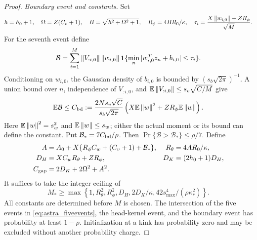\begin{proof}
\emph{Boundary event and constants.}
Set
\[
 h=h_0+1,\quad \Omega=Z(C_v+1),\quad
 B=\sqrt{h^2+\Omega^2+1},\quad R_\phi=4BR_0/\kappa,
 \quad \tau_i=\frac{X\left\lVert w_{i,0}\right\rVert+ZR_\phi}{\sqrt M}.
\]
For the seventh event define
\[
 \mathcal B=\sum_{i=1}^M\left\lVert V_{:i,0}\right\rVert\left\lVert w_{i,0}\right\rVert
 \mathbf1\{\min_n|w_{i,0}^Tz_n+b_{i,0}|\le\tau_i\}.
\]
Conditioning on $w_{i,0}$, the Gaussian density of $b_{i,0}$ is bounded
by $(s_b\sqrt{2\pi})^{-1}$. A union bound over $n$, independence
of $V_{:i,0}$, and $\mathbb{E}\left\lVert V_{:i,0}\right\rVert\le s_v\sqrt{C/M}$ give
\[
 \mathbb{E}\mathcal B\le C_{\rm bd}
 :=\frac{2Ns_v\sqrt C}{s_b\sqrt{2\pi}}
 \left(X\mathbb{E}\left\lVert w\right\rVert^2+ZR_\phi\mathbb{E}\left\lVert w\right\rVert\right).
\]
Here $\mathbb{E}\left\lVert w\right\rVert^2=s_w^2$ and $\mathbb{E}\left\lVert w\right\rVert\le s_w$; either the actual
moment or its bound can define the constant. Put
$\mathcal B_*=7C_{\rm bd}/\rho$. Then
$\Pr\{\mathcal B>\mathcal B_*\}\le\rho/7$.
Define
\begin{align*}
 A&=A_0+X\{R_\phi C_w+(C_v+1)+\mathcal B_*\},&
 R_\theta&=4AR_0/\kappa,\\
 D_H&=XC_wR_\theta+ZR_\phi,&
 D_K&=(2h_0+1)D_H,\\
 C_{\rm gap}&=2D_K+2\Omega^2+A^2.
\end{align*}
It suffices to take the integer ceiling of
\begin{equation}\label{eq:astra_widththreshold}
 M_*\ge\max\left\{1,R_\theta^2,R_\phi^2,D_H,
              2D_K/\kappa,42s_{\max}^4/(\rho\kappa_*^2)\right\}.
\end{equation}
All constants are determined before $M$ is chosen. The intersection
of the five events in \eqref{eq:astra_fiveevents}, the head-kernel
event, and the boundary event has probability at least $1-\rho$.
Initialization at a kink has probability zero and may be excluded
without another probability charge.


\end{proof}
